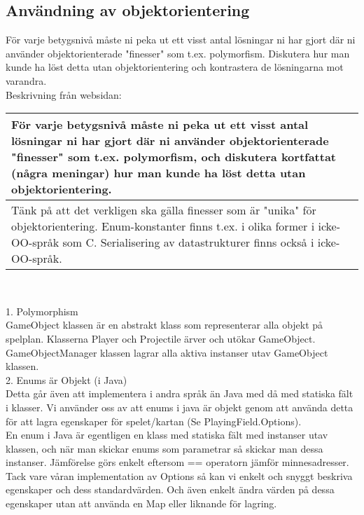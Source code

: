 \subsection{Användning av objektorientering}
{\color{red}För varje betygsnivå måste ni peka ut ett visst antal lösningar ni har gjort där ni använder objektorienterade "finesser" som t.ex. polymorfism.  Diskutera hur man kunde ha löst detta utan objektorientering och kontrastera de lösningarna mot varandra. \\
Beskrivning från websidan:\\
\begin{tabular}{| p{11cm} |}
    \hline
    För varje betygsnivå måste ni peka ut ett visst antal lösningar ni har gjort där ni använder objektorienterade "finesser" som t.ex. polymorfism, och diskutera kortfattat (några meningar) hur man kunde ha löst detta utan objektorientering. \\ \hline
    Tänk på att det verkligen ska gälla finesser som är "unika" för objektorientering. Enum-konstanter finns t.ex. i olika former i icke-OO-språk som C. Serialisering av datastrukturer finns också i icke-OO-språk. \\ \hline
\end{tabular}\\}
\vspace{11pt}
1. Polymorphism\\
GameObject klassen är en abstrakt klass som representerar alla objekt på spelplan. Klasserna Player och Projectile ärver och utökar GameObject.\\
GameObjectManager klassen lagrar alla aktiva instanser utav GameObject klassen.\\
\vspace{11pt}
2. Enums är Objekt (i Java)\\
Detta går även att implementera i andra språk än Java med då med statiska fält i klasser.
Vi använder oss av att enums i java är objekt genom att använda detta för att lagra egenskaper för spelet/kartan (Se PlayingField.Options).\\
En enum i Java är egentligen en klass med statiska fält med instanser utav klassen, och när man skickar enums som parametrar så skickar man dessa instanser. Jämförelse görs enkelt eftersom == operatorn jämför minnesadresser.\\
Tack vare våran implementation av Options så kan vi enkelt och snyggt beskriva egenskaper och dess standardvärden. Och även enkelt ändra värden på dessa egenskaper utan att använda en Map eller liknande för lagring.\\
